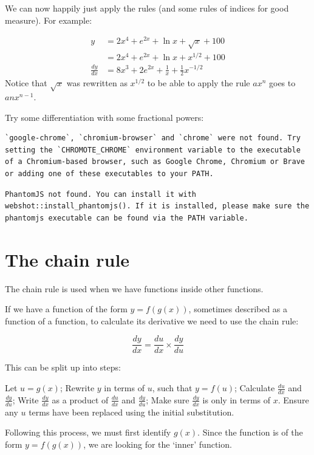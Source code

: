 \documentclass[
  a4paper,
]{scrbook}
\begin{document}
We can now happily just apply the rules (and some rules of indices for
good measure). For example:

\[
\begin{aligned}
y &= 2x^4 + e^{2x} + \ln{x} + \sqrt{x} + 100 \\
&= 2x^4 + e^{2x} + \ln{x} + x^{1/2} + 100 \\
\frac{dy}{dx} &= 8x^3 + 2e^{2x} + \frac{1}{x} + \frac{1}{2}x^{-1/2} 
\end{aligned}
\] Notice that \(\sqrt{x}\) was rewritten as \(x^{1/2}\) to be able to
apply the rule \(ax^n\) goes to \(anx^{n-1}\).

Try some differentiation with some fractional powers:

\begin{verbatim}
`google-chrome`, `chromium-browser` and `chrome` were not found. Try setting the `CHROMOTE_CHROME` environment variable to the executable of a Chromium-based browser, such as Google Chrome, Chromium or Brave or adding one of these executables to your PATH.
\end{verbatim}

\begin{verbatim}
PhantomJS not found. You can install it with webshot::install_phantomjs(). If it is installed, please make sure the phantomjs executable can be found via the PATH variable.
\end{verbatim}

\section{The chain rule}\label{the-chain-rule}

The chain rule is used when we have functions inside other functions.

If we have a function of the form \(y=f(g(x))\), sometimes described as
a function of a function, to calculate its derivative we need to use the
chain rule:

\[
\frac{dy}{dx} = \frac{du}{dx} \times \frac{dy}{du}
\]

This can be split up into steps:

Let \(u=g(x)\); Rewrite \(y\) in terms of \(u\), such that \(y=f(u)\);
Calculate \(\frac{du}{dx}\) and \(\frac{dy}{du}\); Write
\(\frac{dy}{dx}\) as a product of \(\frac{du}{dx}\) and
\(\frac{dy}{du}\); Make sure \(\frac{dy}{dx}\) is only in terms of
\(x\). Ensure any \(u\) terms have been replaced using the initial
substitution.

Following this process, we must first identify \(g(x)\). Since the
function is of the form \(y=f(g(x))\), we are looking for the `inner'
function.
\end{document}
